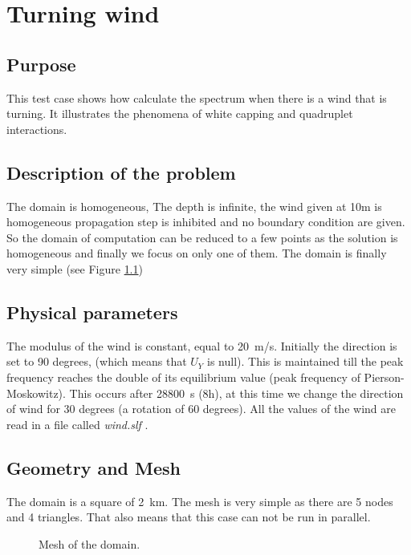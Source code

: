 \chapter{Turning wind}
%

%
\section{Purpose}
%
This test case shows how \tomawac calculate the spectrum when there is a wind
that is turning. It illustrates the phenomena of white capping and quadruplet
interactions.

%
\section{Description of the problem}
%
The domain is homogeneous, The depth is infinite, the wind given at 10m is
homogeneous  propagation step is inhibited and no boundary condition are given.
So the domain of computation can be reduced to a few points as the solution is
homogeneous and finally we focus on only one of them. The domain is finally
very simple (see Figure \ref{mailTW})

\section{Physical parameters}
%
The modulus of the wind is constant, equal to 20~m/s. Initially the direction
is set to 90 degrees, (which means that $U_Y$ is null). This is maintained till
the peak frequency reaches the double of its equilibrium value (peak frequency
of Pierson-Moskowitz). This occurs after 28800~s (8h), at this time we change
the direction of wind for 30 degrees (a rotation of 60 degrees). All the values
of the wind are read in a file called {\it wind.slf  }.
%
%
\section{Geometry and Mesh}
%
The domain is a square of 2~km.
The mesh is very simple as there are 5 nodes and 4 triangles. That also means
that this case can not be run in parallel.
\begin{figure} [!h]
\centering
{}
 \caption{Mesh of the domain.}
\label{mailTW}
\end{figure}
%
%

